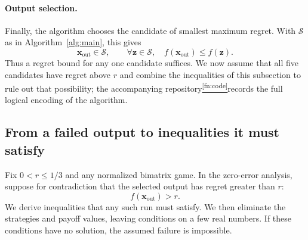 \documentclass[11pt]{article}
\theoremstyle{remark}
\theoremstyle{plain}
\newcommand{\codefootref}{\hyperref[fn:code]{\textsuperscript{\ref*{fn:code}}}}
\begin{document}
\paragraph{Output selection.}
Finally, the algorithm chooses the candidate of smallest maximum
regret. With $\mathcal S$ as in Algorithm~\ref{alg:main}, this gives
\begin{equation}
 \boldsymbol{x}_{\mathrm{out}}\in\mathcal S,\qquad
 \forall\boldsymbol{z}\in\mathcal S,\quad
 f(\boldsymbol{x}_{\mathrm{out}})\le f(\boldsymbol{z}).
 \label{eq:properties-selection}
\end{equation}
Thus a regret bound for any one candidate suffices. We now assume
that all five candidates have regret above $r$ and combine the
inequalities of this subsection to rule out that possibility; the
accompanying repository\codefootref records the full logical
encoding of the algorithm.

\subsection{From a failed output to inequalities it must satisfy}
\label{sec:reduction}

Fix $0<r\le1/3$ and any normalized bimatrix game. In the
zero-error analysis, suppose for contradiction that the selected
output has regret greater than $r$:
\begin{equation}
 f(\boldsymbol x_{\mathrm{out}})>r.
 \label{eq:failure-hypothesis}
\end{equation}
We derive inequalities that any such run must satisfy. We then
eliminate the strategies and payoff values, leaving conditions on
a few real numbers. If these conditions have no solution, the
assumed failure is impossible.
\end{document}
